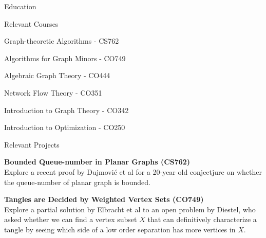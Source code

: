\documentclass{cv}
\begin{document}
\begin{rSection}{Education}
\begin{rSubsection}{Relevant Courses}{}{}{}
	\item Graph-theoretic Algorithms - CS762
	\item Algorithms for Graph Minors - CO749
	\item Algebraic Graph Theory - CO444
	\item Network Flow Theory - CO351
	\item Introduction to Graph Theory - CO342
	\item Introduction to Optimization - CO250
\end{rSubsection}

\begin{rSubsection}{Relevant Projects}{}{}{}
	\item \textbf{Bounded Queue-number in Planar Graphs (CS762)} \\ 
	Explore a recent proof by Dujmovi\'{c} et al for a 20-year old conjectjure on whether the queue-number of planar graph is bounded. \\

	\item \textbf{Tangles are Decided by Weighted Vertex Sets (CO749)} \\
	Explore a partial solution by Elbracht et al to an open problem by Diestel, who asked whether we can find a vertex subset $X$ that can definitively characterize a tangle by seeing which side of a low order separation has more vertices in $X$. 
\end{rSubsection}
\end{rSection}
\end{document}
